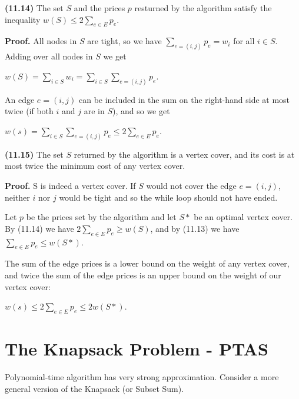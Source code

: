 \documentclass{proc}
\begin{document}
\begin{mdframed}
    \textbf{(11.14)} The set $S$ and the prices $p$ resturned by the algorithm satisfy the inequality $w(S) \le 2 \sum_{e \in E} p_e$.
    
    \textbf{Proof.} All nodes in $S$ are tight, so we have $\sum_{e=(i,j)} p_e = w_i$ for all $i \in S$. Adding over all nodes in $S$ we get
    
    $w(S) = \sum_{i \in S} w_i = \sum_{i \in S} \sum_{e=(i,j)} p_e$.
    
    An edge $e=(i,j)$ can be included in the sum on the right-hand side at most twice (if both $i$ and $j$ are in $S$), and so we get
    
    $w(s) = \sum_{i \in S} \sum_{e=(i,j)} p_e \le 2 \sum_{e \in E} p_e$.
\end{mdframed}

\begin{mdframed}
    \textbf{(11.15)} The set $S$ returned by the algorithm is a vertex cover, and its cost is at most twice the minimum cost of any vertex cover.
    
    \textbf{Proof.} S is indeed a vertex cover. If $S$ would not cover the edge $e=(i,j)$, neither $i$ nor $j$ would be tight and so the while loop should not have ended.
    
    Let $p$ be the prices set by the algorithm and let $S*$ be an optimal vertex cover. By (11.14) we have $2 \sum_{e \in E} p_e \ge w(S)$, and by (11.13) we have $\sum_{e \in E} p_e \le w(S*)$.
    
    The sum of the edge prices is a lower bound on the weight of any vertex cover, and twice the sum of the edge prices is an upper bound on the weight of our vertex cover:
    
    $w(s) \le 2 \sum_{e \in E} p_e \le 2w(S*)$.
\end{mdframed}

\section{The Knapsack Problem - PTAS}
Polynomial-time algorithm has very strong approximation. Consider a more general version of the Knapsack (or Subset Sum). 
\end{document}
